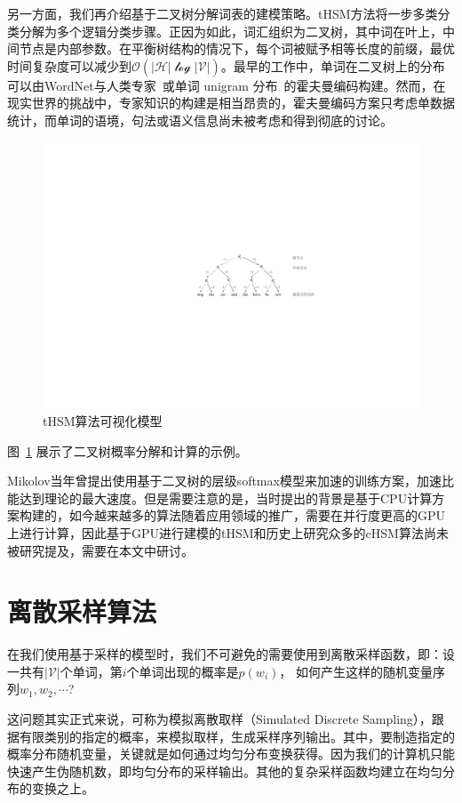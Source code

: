 另一方面，我们再介绍基于二叉树分解词表的建模策略。tHSM方法将一步多类分类分解为多个逻辑分类步骤。正因为如此，词汇组织为二叉树，其中词在叶上，中间节点是内部参数。在平衡树结构的情况下，每个词被赋予相等长度的前缀，最优时间复杂度可以减少到$\mathcal{O(|H|\log \mathcal{|V|})}$。最早的工作中，单词在二叉树上的分布可以由WordNet与人类专家~或单词 unigram 分布~的霍夫曼编码构建。然而，在现实世界的挑战中，专家知识的构建是相当昂贵的，霍夫曼编码方案只考虑单数据统计，而单词的语境，句法或语义信息尚未被考虑和得到彻底的讨论。

\begin{figure}[!h]
  \centering
\includegraphics[width=0.9\linewidth]{./figures/thsm-example.pdf}
\caption{tHSM算法可视化模型}\label{fig:case_thsm}
\end{figure}

图~\ref{fig:case_thsm} 展示了二叉树概率分解和计算的示例。

Mikolov当年曾提出使用基于二叉树的层级softmax模型来加速的训练方案，加速比能达到理论的最大速度。但是需要注意的是，当时提出的背景是基于CPU计算方案构建的，如今越来越多的算法随着应用领域的推广，需要在并行度更高的GPU上进行计算，因此基于GPU进行建模的tHSM和历史上研究众多的cHSM算法尚未被研究提及，需要在本文中研讨。

\section{离散采样算法}
在我们使用基于采样的模型时，我们不可避免的需要使用到离散采样函数，即：设一共有$|\mathcal{V}|$个单词，第$i$个单词出现的概率是$p(w_i)$， 如何产生这样的随机变量序列$w_1,w_2,\cdots$?

这问题其实正式来说，可称为模拟离散取样（Simulated Discrete Sampling），跟据有限类别的指定的概率，来模拟取样，生成采样序列输出。其中，要制造指定的概率分布随机变量，关键就是如何通过均匀分布变换获得。因为我们的计算机只能快速产生伪随机数，即均匀分布的采样输出。其他的复杂采样函数均建立在均匀分布的变换之上。
